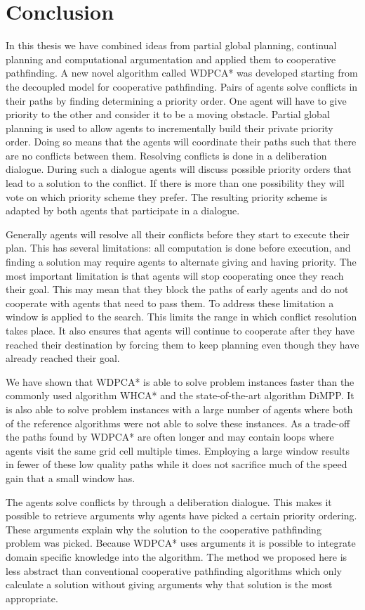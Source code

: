 \section{Conclusion}
In this thesis we have combined ideas from partial global planning, continual
planning and computational argumentation and applied them to cooperative 
pathfinding.
A new novel algorithm called WDPCA* was developed starting from the decoupled
model for cooperative pathfinding. Pairs of agents solve conflicts in their
paths by finding determining a priority order. One agent will have to give
priority to the other and consider it to be a moving obstacle. Partial global
planning is used to allow agents to incrementally build their private priority
order. Doing so means that the agents will coordinate their paths such that
there are no conflicts between them. Resolving conflicts is done in a
deliberation dialogue. During such a dialogue agents will discuss possible
priority orders that lead to a solution to the conflict. If there is more than
one possibility they will vote on which priority scheme they prefer. The
resulting priority scheme is adapted by both agents that participate in a
dialogue.

Generally agents will resolve all their conflicts before they start to execute
their plan. This has several limitations: all computation is done before
execution, and finding a solution may require agents to alternate giving and
having priority. The most important limitation is that agents will stop
cooperating once they reach their goal. This may mean that they block the paths
of early agents and do not cooperate with agents that need to pass them. To
address these limitation a window is applied to the search. This limits the
range in which conflict resolution takes place. It also ensures that agents
will continue to cooperate after they have reached their destination by forcing
them to keep planning even though they have already reached their goal.

We have shown that WDPCA* is able to solve problem instances faster than the
commonly used algorithm WHCA* and the state-of-the-art algorithm DiMPP. It is
also able to solve problem instances with a large number of agents where both
of the reference algorithms were not able to solve these instances. As a
trade-off the paths found by WDPCA* are often longer and may contain loops
where agents visit the same grid cell multiple times. Employing a large window
results in fewer of these low quality paths while it does not sacrifice much of
the speed gain that a small window has.

The agents solve conflicts by through a deliberation dialogue. This makes it
possible to retrieve arguments why agents have picked a certain priority
ordering. These arguments explain why the solution to the cooperative
pathfinding problem was picked. Because WDPCA* uses arguments it is possible to
integrate domain specific knowledge into the algorithm. The method we proposed
here is less abstract than conventional cooperative pathfinding algorithms
which only calculate a solution without giving arguments why that solution is
the most appropriate.